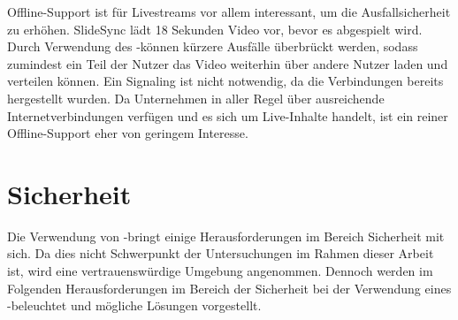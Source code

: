 Offline-Support ist für Livestreams vor allem interessant, um die Ausfallsicherheit zu erhöhen. SlideSync lädt 18 Sekunden Video vor, bevor es abgespielt wird. Durch Verwendung des \pTp-\cdn können kürzere Ausfälle überbrückt werden, sodass zumindest ein Teil der Nutzer das Video weiterhin über andere Nutzer laden und verteilen können. Ein Signaling ist nicht notwendig, da die Verbindungen bereits hergestellt wurden. Da Unternehmen in aller Regel über ausreichende Internetverbindungen verfügen und es sich um Live-Inhalte handelt, ist ein reiner Offline-Support eher von geringem Interesse. 


\section{Sicherheit}\label{e:security}
Die Verwendung von \pTp-\cdns bringt einige Herausforderungen im Bereich Sicherheit mit sich. Da dies nicht Schwerpunkt der Untersuchungen im Rahmen dieser Arbeit ist, wird eine vertrauenswürdige Umgebung angenommen. Dennoch werden im Folgenden Herausforderungen im Bereich der Sicherheit bei der Verwendung eines \pTp-\cdns beleuchtet und mögliche Lösungen vorgestellt.

